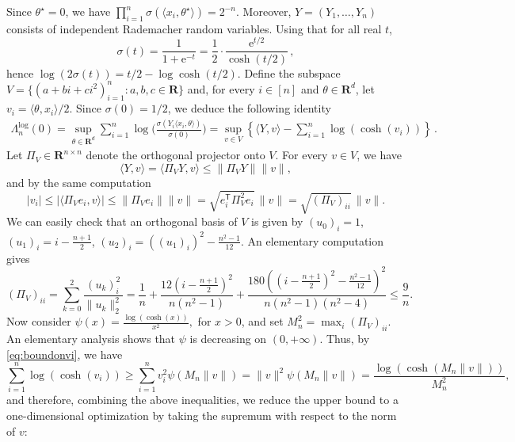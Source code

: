 \documentclass[11pt, letterpaper, hidelinks]{article}
\makeatletter
\renewcommand{\proofname}{\textit{\textbf{Proof}}}
\renewenvironment{proof}[1][\proofname]{\par\pushQED{\qed}\normalfont \topsep6\p@\@plus6\p@\relax\trivlist\item[\hskip\labelsep#1\@addpunct{}]\ignorespaces}{\popQED\endtrivlist\@endpefalse}
\newcommand{\R}{\mathbf R}
\newcommand{\e}{\mathrm{e}}
\newcommand{\1}{\mathbf 1}
\renewcommand{\ge}{\geqslant}
\renewcommand{\leq}{\leqslant}
\newcommand{\T}{\mathsf{T}}
\theoremstyle{plain}
\theoremstyle{definition}
\newcommand{\thetastar}{\theta^\star}
\makeatother
\begin{document}
\begin{proof}
Since $\thetastar = 0$, we have
$
\prod_{i = 1}^n \sigma(\langle x_i, \thetastar\rangle) = 2^{-n}.$
Moreover, $Y = (Y_1, \ldots, Y_n)$ consists of independent Rademacher random variables. Using that for all real $t$,
\begin{equation}
	\sigma(t) = \frac{1}{1+\e^{-t}} = \frac 1 2 \cdot \frac{\e^{t/2}}{\cosh(t/2)} \, ,
\end{equation}
hence $\log(2\sigma(t)) = t/2 - \log\cosh(t/2)$. Define the subspace $V = \{(a + bi + ci^2)_{i = 1}^n : a, b, c \in \R\}$ and, for every $i \in [n]$ and $\theta \in \R^{d}$, let $v_i = \langle \theta, x_i \rangle/2$. Since $\sigma(0)=1/2$, we deduce the following identity
\begin{align}
\Lambda_n^{\log}(0)
	= \sup_{\theta \in \R^{d}} \sum_{i=1}^n
		\log\Big(\frac{\sigma(Y_i\langle x_i,\theta\rangle)}{\sigma(0)} \Big)
	= \sup\limits_{v \in V}\left\{\langle Y, v\rangle - \sum\limits_{i = 1}^n \log(\cosh(v_i))\right\} \, .
\end{align}
 Let $\Pi_{V} \in \R^{n \times n}$ denote the orthogonal projector onto $V$. For every $v \in V$, we have
\[
\langle Y, v\rangle = \langle \Pi_{V} Y, v\rangle \leq \|\Pi_{V} Y\| \|v\|,
\]
and by the same computation
\begin{equation}
\label{eq:boundonvi}
|v_i| \leq |\langle \Pi_{V} e_i, v\rangle| \leq \|\Pi_{V} e_i\| \|v\| = \sqrt{e_i^{\T}\Pi_{V}^2 e_i}\,\|v\| = \sqrt{(\Pi_{V})_{ii}}\,\|v\|.
\end{equation}
We can easily check that an orthogonal basis of $V$ is given by $(u_0)_i = 1$, $(u_1)_i = i - \frac{n+1}{2}$, $(u_2)_i = ((u_1)_i)^2 - \frac{n^2 - 1}{12}$. An elementary computation gives
\begin{equation}
\label{eq:projdiagonal}
(\Pi_{V})_{ii}
= \sum_{k = 0}^2 \frac{(u_k)_i^2}{\|u_k\|_2^2}
=
\frac1n
+\frac{12\left(i-\frac{n+1}{2}\right)^2}{n(n^2-1)}
+\frac{180\left(\left(i-\frac{n+1}{2}\right)^2-\frac{n^2-1}{12}\right)^2}{n(n^2-1)(n^2-4)}
\leq \frac9n.
\end{equation}
Now consider
$
\psi(x) = \frac{\log(\cosh(x))}{x^2},
$
for $x > 0$,
and set $M_n^2 = \max_i (\Pi_{V})_{ii}$. An elementary analysis shows that $\psi$ is decreasing on $(0,+\infty)$. Thus, by \eqref{eq:boundonvi}, we have
\[
\sum\limits_{i = 1}^n \log(\cosh(v_i))
\ge
\sum\limits_{i = 1}^n v_i^2 \psi\left(M_n \|v\|\right)
=
\|v\|^2 \psi\left(M_n \|v\|\right)
=
\frac{\log(\cosh(M_n \|v\|))}{M_n^2},
\]
and therefore, combining the above inequalities, we reduce the upper bound to a one-dimensional optimization by taking the supremum with respect to the norm of $v$:

\end{proof}
\end{document}
